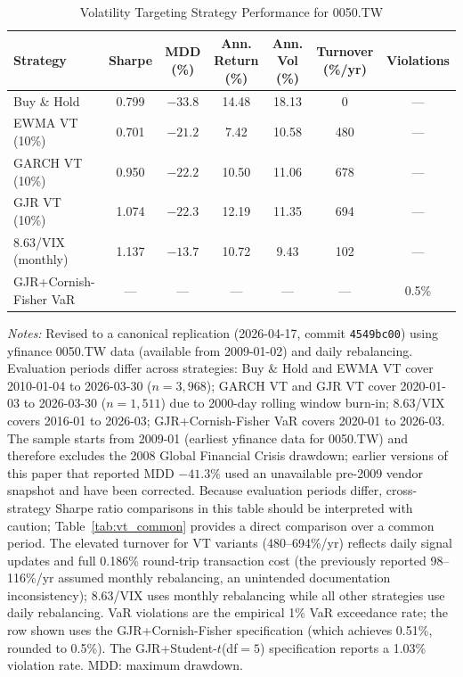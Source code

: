 \begin{table}[H]
\centering
\caption{Volatility Targeting Strategy Performance for 0050.TW}
\label{tab:vt_results}
\begin{tabular}{lcccccc}
\toprule
Strategy & Sharpe & MDD (\%) & Ann. Return (\%) & Ann. Vol (\%) & Turnover (\%/yr) & Violations \\
\midrule
Buy \& Hold & 0.799 & $-33.8$ & 14.48 & 18.13 & 0 & --- \\
EWMA VT (10\%) & 0.701 & $-21.2$ & 7.42 & 10.58 & 480 & --- \\
GARCH VT (10\%) & 0.950 & $-22.2$ & 10.50 & 11.06 & 678 & --- \\
GJR VT (10\%) & 1.074 & $-22.3$ & 12.19 & 11.35 & 694 & --- \\
8.63/VIX (monthly) & 1.137 & $-13.7$ & 10.72 & 9.43 & 102 & --- \\ %
GJR+Cornish-Fisher VaR & --- & --- & --- & --- & --- & 0.5\% \\%
\bottomrule
\end{tabular}
\begin{flushleft}
\small \textit{Notes:} Revised to a canonical replication (2026-04-17, commit \texttt{4549bc00}) using yfinance 0050.TW data (available from 2009-01-02) and daily rebalancing. Evaluation periods differ across strategies: Buy \& Hold and EWMA VT cover 2010-01-04 to 2026-03-30 ($n = 3{,}968$); GARCH VT and GJR VT cover 2020-01-03 to 2026-03-30 ($n = 1{,}511$) due to 2000-day rolling window burn-in; 8.63/VIX covers 2016-01 to 2026-03; GJR+Cornish-Fisher VaR covers 2020-01 to 2026-03. The sample starts from 2009-01 (earliest yfinance data for 0050.TW) and therefore excludes the 2008 Global Financial Crisis drawdown; earlier versions of this paper that reported MDD $-41.3\%$ used an unavailable pre-2009 vendor snapshot and have been corrected. Because evaluation periods differ, cross-strategy Sharpe ratio comparisons in this table should be interpreted with caution; Table~\ref{tab:vt_common} provides a direct comparison over a common period. The elevated turnover for VT variants (480--694\%/yr) reflects daily signal updates and full 0.186\% round-trip transaction cost (the previously reported 98--116\%/yr assumed monthly rebalancing, an unintended documentation inconsistency); 8.63/VIX uses monthly rebalancing while all other strategies use daily rebalancing. VaR violations are the empirical 1\% VaR exceedance rate; the row shown uses the GJR+Cornish-Fisher specification (which achieves 0.51\%, rounded to 0.5\%). The GJR+Student-$t$(df$= 5$) specification reports a 1.03\% violation rate. MDD: maximum drawdown.
\end{flushleft}
\end{table}

